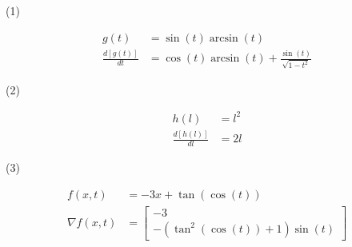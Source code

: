 \documentclass[fontsize=100pt]{article}
\begin{document}
(1)

\begin{align*}
	g{\left(t \right)} &= \sin{\left(t \right)} \operatorname{arcsin}{\left(t \right)}\\
	\frac{d \left[ g(t) \right ] }{dt} &= \cos{\left(t \right)} \operatorname{arcsin}{\left(t \right)} + \frac{\sin{\left(t \right)}}{\sqrt{1 - t^{2}}}
\end{align*}

(2)

\begin{align*}
	h{\left(l \right)} &= l^{2}\\
	\frac{d \left[ h(l) \right ] }{dl} &= 2 l
\end{align*}

(3)

\begin{align*}
	f{\left(x,t \right)} &= - 3 x + \tan{\left(\cos{\left(t \right)} \right)}\\
	\nabla f{\left(x,t \right)} &= \left[\begin{matrix}-3\\- \left(\tan^{2}{\left(\cos{\left(t \right)} \right)} + 1\right) \sin{\left(t \right)}\end{matrix}\right]
\end{align*}
\end{document}
